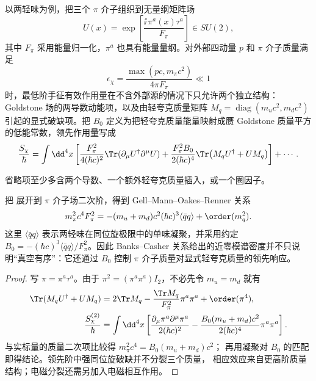 \begin{definition}[两味领先手征有效作用量]
以两轻味为例，把三个 \(\pi\) 介子组织到无量纲矩阵场
\begin{equation*}
 U(x)=\exp\!\left[\frac{\ii\,\pi^a(x)\tau^a}{F_\pi}\right]\in SU(2),
\end{equation*}
其中 $F_\pi$ 采用能量归一化，$\pi^a$ 也具有能量量纲。对外部四动量 $p$ 和 \(\pi\) 介子质量满足
\begin{equation}
 {
 \epsilon_\chi
 =\frac{\max(pc,m_\pi c^2)}{4\pi F_\pi}\ll1}
 \label{eq:qcd-chiral-control-dp33}
\end{equation}
时，最低阶手征有效作用量在不含外部源的情况下只允许两个独立结构：Goldstone 场的两导数动能项，以及由轻夸克质量矩阵 $M_q=\operatorname{diag}(m_uc^2,m_dc^2)$ 引起的显式破缺项。把 $B_0$ 定义为把轻夸克质量能量映射成赝 Goldstone 质量平方的低能常数，领先作用量写成
\begin{equation}
 {
 \frac{S_\chi}{\hbar}
 =\int\dd^4 x\left[
 \frac{F_\pi^2}{4(\hbar c)^2}
 \Tr(\partial_\mu U^\dagger\partial^\mu U)
 +\frac{F_\pi^2B_0}{2(\hbar c)^4}
 \Tr\!\left(M_qU^\dagger+UM_q\right)
 \right]+\cdots .}
 \label{eq:qcd-chiral-lo-action-dp33}
\end{equation}
\end{definition}

省略项至少多含两个导数、一个额外轻夸克质量插入，或一个圈因子。

\begin{proposition}
把 展开到 \(\pi\) 介子场二次阶，得到 Gell--Mann--Oakes--Renner 关系
\begin{equation}
 {
 m_\pi^2c^4F_\pi^2
 =-(m_u+m_d)c^2(\hbar c)^3
 \langle\bar q q\rangle
 +\order(m_q^2).}
 \label{eq:qcd-gmor-dp33}
\end{equation}
这里 $\langle\bar q q\rangle$ 表示两轻味在同位旋极限中的单味凝聚，并采用约定 $B_0=-(\hbar c)^3\langle\bar q q\rangle/F_\pi^2$。因此 Banks--Casher 关系给出的近零模谱密度并不只说明“真空有序”：它还通过 $B_0$ 控制 \(\pi\) 介子质量对显式轻夸克质量的领先响应。

\end{proposition}
\begin{proof}
写 $\pi=\pi^a\tau^a$。由于 $\pi^2=(\pi^a\pi^a)I_2$，不必先令
$m_u=m_d$ 就有
\begin{align*}
\Tr(M_qU^\dagger+UM_q)
&=2\Tr M_q-\frac{\Tr M_q}{F_\pi^2}\pi^a\pi^a+\order(\pi^4),\\
\frac{S_\chi^{(2)}}{\hbar}
&=\int\dd^4x\left[
\frac{\partial_\mu\pi^a\partial^\mu\pi^a}{2(\hbar c)^2}
-\frac{B_0(m_u+m_d)c^2}{2(\hbar c)^4}\pi^a\pi^a\right].
\end{align*}
与实标量的质量二次项比较得 $m_\pi^2c^4=B_0(m_u+m_d)c^2$；
再用凝聚对 $B_0$ 的匹配即得结论。领先阶中强同位旋破缺并不分裂三个质量，
相应效应来自更高阶质量结构；电磁分裂还需另加入电磁相互作用。
\end{proof}

